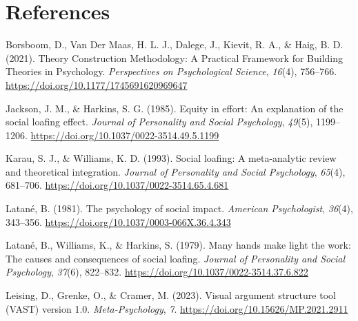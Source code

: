 \documentclass[
  man,
  longtable,
  a4paper,
  nolmodern,
  notxfonts,
  notimes,
  colorlinks=true,linkcolor=blue,citecolor=blue,urlcolor=blue]{apa7}
\newlength{\cslhangindent}
\newenvironment{CSLReferences}[2] %
 {\begin{list}{}{%
  \setlength{\itemindent}{0pt}
  \setlength{\leftmargin}{0pt}
  \setlength{\parsep}{0pt}
  \ifodd #1
   \setlength{\leftmargin}{\cslhangindent}
   \setlength{\itemindent}{-1\cslhangindent}
  \fi
  \setlength{\itemsep}{#2\baselineskip}}}
 {\end{list}}
\begin{document}
\section{References}\label{references}

\label{refs}
\begin{CSLReferences}{1}{0}
Borsboom, D., Van Der Maas, H. L. J., Dalege, J., Kievit, R. A., \&
Haig, B. D. (2021). Theory Construction Methodology: A Practical
Framework for Building Theories in Psychology. \emph{Perspectives on
Psychological Science}, \emph{16}(4), 756--766.
\url{https://doi.org/10.1177/1745691620969647}

Jackson, J. M., \& Harkins, S. G. (1985). Equity in effort: An
explanation of the social loafing effect. \emph{Journal of Personality
and Social Psychology}, \emph{49}(5), 1199--1206.
\url{https://doi.org/10.1037/0022-3514.49.5.1199}

Karau, S. J., \& Williams, K. D. (1993). Social loafing: A meta-analytic
review and theoretical integration. \emph{Journal of Personality and
Social Psychology}, \emph{65}(4), 681--706.
\url{https://doi.org/10.1037/0022-3514.65.4.681}

Latané, B. (1981). The psychology of social impact. \emph{American
Psychologist}, \emph{36}(4), 343--356.
\url{https://doi.org/10.1037/0003-066X.36.4.343}

Latané, B., Williams, K., \& Harkins, S. (1979). Many hands make light
the work: The causes and consequences of social loafing. \emph{Journal
of Personality and Social Psychology}, \emph{37}(6), 822--832.
\url{https://doi.org/10.1037/0022-3514.37.6.822}

Leising, D., Grenke, O., \& Cramer, M. (2023). Visual argument structure
tool (VAST) version 1.0. \emph{Meta-Psychology}, \emph{7}.
\url{https://doi.org/10.15626/MP.2021.2911}

\end{CSLReferences}

\newpage
\appendix

\appendix

\section{}\label{}
\end{document}
